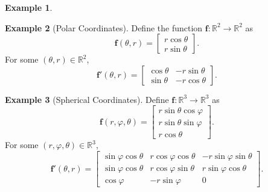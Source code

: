\documentclass{article}
\newcommand{\R}{\mathbb{R}}
\newcommand{\x}{\mathbf{x}}
\newcommand{\f}{\mathbf{f}}
\theoremstyle{definition}
\newtheorem{example}{Example}[section]
\begin{document}
\begin{example}
\begin{figure}[h!]
	\caption{}
\end{figure}	

\begin{figure}[h!]
	\centering
	\caption{}
\end{figure}	
\end{example}

\begin{example}[Polar Coordinates]
	Define the function $ \mathbf{f}:\R^2\to\R^2 $ as 
$$ \f(\theta, r) =\begin{bmatrix}
	r\cos \theta\\r\sin\theta
\end{bmatrix}  .$$ For some $ (\theta,r)\in \R^2 $, $$ \f'(\theta,r)=\begin{bmatrix}
\cos\theta &-r\sin\theta\\\sin\theta&-r\cos\theta
\end{bmatrix}.$$
\end{example}

\begin{example}[Spherical Coordinates]
Define $ \f:\R^3\to\R^3 $ as 
$$ \f(r, \varphi,\theta) =\begin{bmatrix}
	r\sin \theta\cos\varphi\\r\sin \theta\sin\varphi\\ r\cos\theta
\end{bmatrix}  .$$ 
For some $ (r, \varphi,\theta)\in \R^3 $, $$ \f'(\theta,r)=\begin{bmatrix}
\sin\varphi\cos\theta & r\cos\varphi\cos\theta & - r\sin\varphi\sin\theta\\
\sin\varphi\cos\theta & r\cos\varphi\sin\theta & r\sin\varphi\cos\theta\\
\cos\varphi& -r\sin\varphi & 0
\end{bmatrix}.$$
\end{example}
\end{document}

